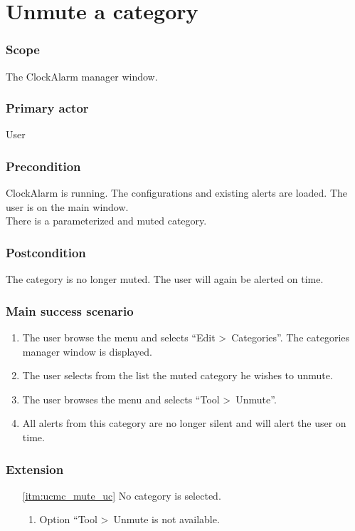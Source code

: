 \section{Unmute a category}\label{subsec:usecase_unmute_category}

\subsubsection{Scope}
The ClockAlarm manager window.
\subsubsection{Primary actor}
User
\subsubsection{Precondition}
ClockAlarm is running. The configurations and existing alerts are loaded. The user is on the main window.
\\There is a parameterized and muted category.
\subsubsection{Postcondition}
The category is no longer muted. The user will again be alerted on time.
\subsubsection{Main success scenario}
\begin{enumerate}
	\item The user browse the menu and selects ``Edit \textgreater~Categories''. The categories manager window is displayed. 
	\item The user selects from the list the muted category he wishes to unmute.
	\item \label{itm:ucmc_mute_uc}The user browses the menu and selects ``Tool \textgreater~Unmute''.
	\item All alerts from this category are no longer silent and will alert the user on time.
\end{enumerate}
\subsubsection{Extension}
\begin{enumerate}
	\item[\ref{itm:ucmc_mute_uc}] No category is selected.
	\begin{enumerate}[i]
		\item Option ``Tool \textgreater~Unmute is not available.
	\end{enumerate}
\end{enumerate}
